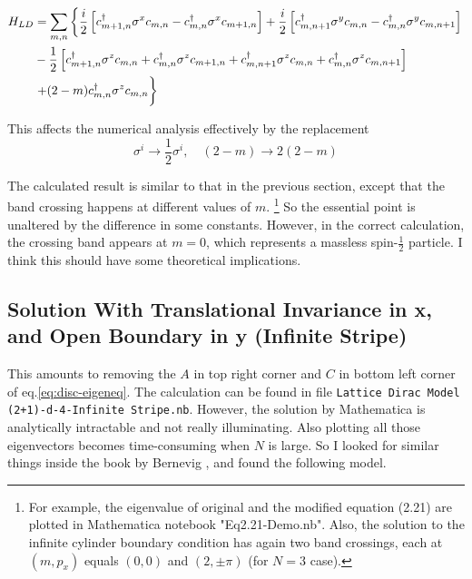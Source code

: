 \documentclass{article}
\begin{document}
\begin{align}
    H_{LD} &= \sum_{m,n}\left\{
        \frac{i}{2} \left[ c^\dagger_{m+1,n}\sigma^x c_{m,n}
            - c^\dagger_{m,n}\sigma^x c_{m+1,n}\right]
        + \frac{i}{2} \left[ c^\dagger_{m,n+1}\sigma^y c_{m,n}
            - c^\dagger_{m,n}\sigma^y c_{m,n+1} \right]
        \right.
        \nonumber\\
        &- \frac{1}{2}\left[
            c^\dagger_{m+1,n}\sigma^z c_{m,n}
            + c^\dagger_{m,n}\sigma^z c_{m+1,n}
            + c^\dagger_{m,n+1}\sigma^z c_{m,n}
            + c^\dagger_{m,n}\sigma^z c_{m,n+1}
        \right]
        \nonumber\\
        & \left. + (2-m) c^\dagger_{m,n}\sigma^z c_{m,n}
        \vphantom{\frac12}
    \right\}
\end{align}

This affects the numerical analysis effectively by the replacement
$$\sigma^i \to \frac{1}{2}\sigma^i,\quad
    (2-m) \to 2(2-m) $$

The calculated result is similar to that in the previous section,
except that the band crossing happens at different values of $m$.
\footnote{For example, the eigenvalue of original and the modified equation
(2.21) are plotted in Mathematica notebook "Eq2.21-Demo.nb". Also,
the solution to the infinite cylinder boundary condition has again
two band crossings, each at $(m,p_x)$ equals $(0,0)$ and
$(2,\pm\pi)$ (for $N=3$ case).}
So the essential point is unaltered by the difference in some
constants. However, in the correct calculation, the crossing band
appears at $m=0$, which represents a massless spin-$\frac{1}{2}$
particle. I think this should have some theoretical implications.

\subsection{Solution With Translational Invariance in x, and Open
Boundary in y (Infinite Stripe)}

This amounts to removing the $A$ in top right corner and $C$ in bottom
left corner of eq.\ref{eq:disc-eigeneq}. The calculation can be found
in file \texttt{Lattice Dirac Model (2+1)-d-4-Infinite Stripe.nb}.
However, the solution by Mathematica is analytically intractable and
not really illuminating. Also plotting all those eigenvectors becomes
time-consuming when $N$ is large. So I looked for similar things
inside the book by Bernevig \cite{Bernevig2013}, and found the
following model.
\end{document}
